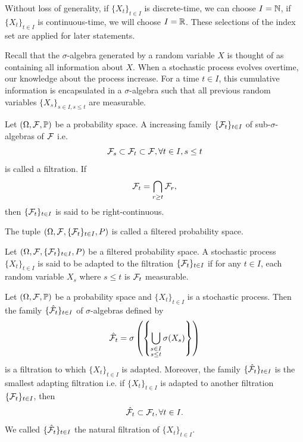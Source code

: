 \begin{remark}
  Without loss of generality, if $\{X_t\}_{t\in I}$ is discrete-time, we can choose $I = \mathbb{N}$, if $\{X_t\}_{t\in I}$ is continuous-time, we will choose $I=\mathbb{R}$. These selections of the index set are applied for later statements.
\end{remark}

Recall that the $\sigma$-algebra generated by a random variable $X$ is thought of as containing all information about $X$. When a stochastic process evolves overtime, our knowledge about the process increase. For a time $t\in I$, this cumulative information is encapsulated in a $\sigma$-algebra such that all previous random variables $\{X_s\}_{s\in I, s\le t}$ are measurable.

\begin{definition}
  Let $(\Omega, \mathcal{F}, \mathbb{P})$ be a probability space. A increasing family $\{\mathcal{F}_t\}_{t\in I}$ of sub-$\sigma$-algebras of $\mathcal{F}$ i.e.
  $$\mathcal{F}_s\subset\mathcal{F}_t \subset \mathcal{F}, \forall t\in I, s\le t$$
  is called a filtration. If
  $$\mathcal{F}_t = \bigcap\limits_{r\ge t} \mathcal{F}_r,$$
  then $\{\mathcal{F}_t\}_{t\in I}$ is said to be right-continuous.

  The tuple $(\Omega, \mathcal{F}, \{\mathcal{F}_t\}_{t\in I}, P)$ is called a filtered probability space.
\end{definition}

\begin{definition}
  Let $(\Omega, \mathcal{F}, \{\mathcal{F}_t\}_{t\in I}, P)$ be a filtered probability space. A stochastic process $\{X_t\}_{t\in I}$ is said to be adapted to the filtration $\{\mathcal{F}_t\}_{t\in I}$ if for any $t\in I$, each random variable $X_s$ where $s\le t$ is $\mathcal{F}_t$ measurable.
\end{definition}

\begin{theorem}
  Let $(\Omega, \mathcal{F}, \mathbb{P})$ be a probability space and $\{X_t\}_{t\in I}$ is a stochastic process. Then the family $\{\hat{\mathcal{F}}_t\}_{t\in I}$ of $\sigma$-algebras defined by
  $$\hat{\mathcal{F}}_t = \sigma\left(\left\{\bigcup\limits_{\substack{s\in I \\ s\le t}} \sigma(X_s)\right\}\right)$$
  is a filtration to which $\{X_t\}_{t\in I}$ is adapted. Moreover, the family $\{\hat{\mathcal{F}}_t\}_{t\in I}$ is the smallest adapting filtration i.e. if $\{X_t\}_{t\in I}$ is adapted to another filtration $\{\mathcal{F}_t\}_{t\in I}$, then
  $$\hat{\mathcal{F}}_t \subset \mathcal{F}_t, \forall t\in I.$$
  We called $\{\hat{\mathcal{F}}_t\}_{t\in I}$ the natural filtration  of $\{X_t\}_{t\in I}$.
\end{theorem}

